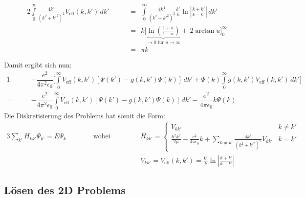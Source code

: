\begin{alignat*}{2}
\int\limits_{0}^{\infty} \frac{4k^4}{(k^2+k '^2)^2}V_\text{eff}(k,k')\,dk' 
						&& \ \ &=\ \ \int\limits_{0}^{\infty} \frac{4k^4}{(k^2+k '^2)^2}\frac{k '}{k}\ln{\left |\frac{k + k '}{k-k'}\right |}\,dk' \\
%
%
						&& \ \ &=\ \ 	k\Big[\underbrace{\ln\left (\frac{1+u}{1-u}\right )}_{\rightarrow 0 \text{ für } u\rightarrow \infty}+\, 2\arctan{u}\Big]_{0}^{\infty}\\  
						&& \ \ &=\ \ 	\pi k
\end{alignat*}
\begin{comment}
%
%
						&& \ \ &=\ \ 	k\int\limits_{0}^{\infty} \frac{4u}{(1+u^2)^2}\ln{\left |\frac{1 + u}{1-u}\right |}\,du \qquad\text{Betrag auflösen}\\
						&& \ \ &=\ \ 	k\int\limits_{0}^{1} \left (\frac{-2}{1+u^2}\right )'\ln{\left (\frac{1 + u}{1-u}\right )}\,du + k\int\limits_{1}^{\infty} \left( \frac{-2}{1+u^2}\right )'\ln{\left (\frac{1 + u}{u-1}\right )}\,du\\
						&& \ \ &\stackrel{\text{P.I.}}{=}\ \ \underbrace{k\left (\frac{-2}{1+u^2}\right )\ln{\left ( \frac{1 + u}{1-u}\right )}\Big |_{0}^{1}+k\left (\frac{-2}{1+u^2}\right )\ln{\left ( \frac{1 + u}{u-1}\right )}\Big |_{1}^{\infty}}_{\text{C.H.}\,\rightarrow \,0}
						+k\int\limits_{0}^{\infty} \frac{2}{1+u^2}\frac{1 - u}{1+u}\frac{2}{(1-u)^2}\,du \\
						&& \ \ &=\ \ 	k\int\limits_{0}^{\infty} \frac{4}{(1-u^4)}\,du  \\
						&& \ \ &=\ \ 	k\int\limits_{0}^{\infty} \left (\frac{1}{1-u}+\frac{1}{1+u}+\frac{2}{1+u^2}\right )\,du\\
						&& \ \ &=\ \ 	k\Big[-\ln{(1-u)}+\ln{(1+u)}+ 2\arctan{u}\Big]_{0}^{\infty}\\  
%
\end{comment}

Damit ergibt sich nun: 
\begin{alignat*}{1}
	&-\dfrac{e^2}{4\pi ^2 \epsilon_0} \Big [\int\limits_{0}^{\infty} V_\text{eff}(k,k')\left [\Psi(k ')-g(k,k')\Psi(k)\right ]\,dk'  
+  \Psi(k)\int\limits_{0}^{\infty} g(k,k')V_\text{eff}(k,k')\,dk' \Big]   \\
= 	\qquad &-\dfrac{e^2}{4\pi^2 \epsilon_0} \int\limits_{0}^{\infty} V_\text{eff}(k,k')\left [\Psi(k ')-g(k,k')\Psi(k)\right ]\,dk' 
-  \dfrac{e^2}{4\pi \epsilon_0}  k\Psi(k) 
\end{alignat*}
Die Diskretisierung des Problems hat somit die Form: 
\begin{alignat*}{3}
\sum\limits_{k'}H_{kk'}\Psi_{k'} = E \Psi_k && \qquad \text{  wobei}\qquad && &H_{kk'}= 
	 \begin{cases}
     V_{kk'}  &k \neq k' \\
     \frac{\hbar ^2 k^2}{2\mu} -\frac{e^2}{4\pi \epsilon_0}k +\sum\limits_{k\neq k'}\frac{4k^4}{(k^2+k '^2)^2}V_{kk'} &k=k'
   \end{cases}\\
  &&  && &V_{kk'} = V_\text{eff}(k,k')=\frac{k '}{k}\ln{\left |\frac{k + k '}{k-k'}\right |}
\end{alignat*}
\subsection{Lösen des 2D Problems}
